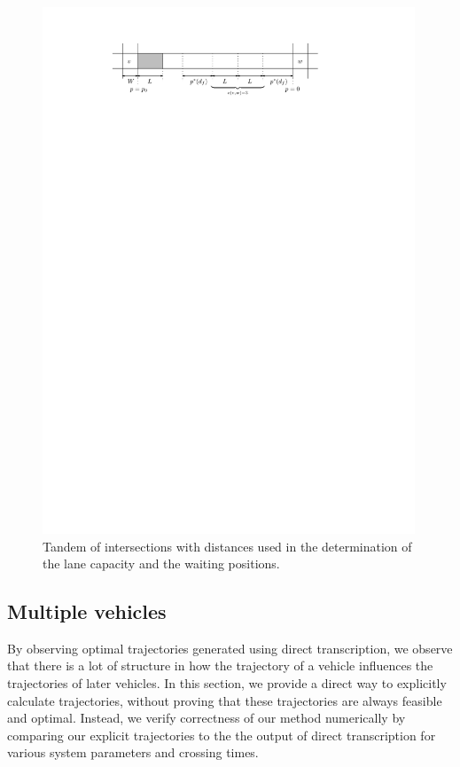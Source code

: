 \documentclass[a4paper]{article}
\theoremstyle{definition}
\theoremstyle{plain}
\begin{document}
\begin{figure}
  \centering
  \includegraphics[width=0.99\textwidth]{figures/motion/tandem_annotated}
  \caption{Tandem of intersections with distances used in the determination of
    the lane capacity and the waiting positions.}
  \label{fig:tandem_annotated}
\end{figure}

\subsection{Multiple vehicles}

By observing optimal trajectories generated using direct transcription, we
observe that there is a lot of structure in how the trajectory of a vehicle
influences the trajectories of later vehicles. In this section, we provide a
direct way to explicitly calculate trajectories, without proving that these
trajectories are always feasible and optimal. Instead, we verify correctness of
our method numerically by comparing our explicit trajectories to the the output
of direct transcription for various system parameters and crossing times.
\end{document}
